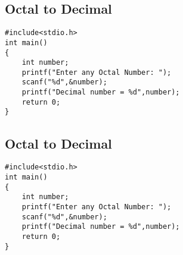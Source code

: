 \documentclass[a4paper,14pt]{article}
\begin{document}
\subsection{Octal to Decimal}
\vspace{0.5cm}
\begin{lstlisting}[caption={Octal to Decimal}]
#include<stdio.h>
int main()
{
    int number;
    printf("Enter any Octal Number: ");
    scanf("%d",&number);
    printf("Decimal number = %d",number);
    return 0;
}
\end{lstlisting}
\newpage

\subsection{Octal to Decimal}
\vspace{0.5cm}
\begin{lstlisting}[caption={Octal to Decimal}]
#include<stdio.h>
int main()
{
    int number;
    printf("Enter any Octal Number: ");
    scanf("%d",&number);
    printf("Decimal number = %d",number);
    return 0;
}
\end{lstlisting}
\newpage
\end{document}

